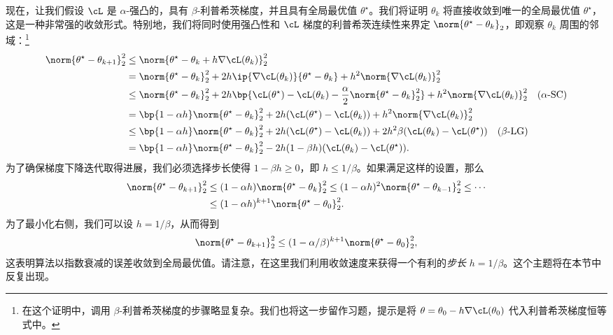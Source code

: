 \documentclass[../../book-main_zh.tex]{subfiles}
\begin{document}
现在，让我们假设 \(\cL\) 是 \(\alpha\)-强凸的，具有 \(\beta\)-利普希茨梯度，并且具有全局最优值 \(\theta^{\star}\)。我们将证明 \(\theta_{k}\) 将直接收敛到唯一的全局最优值 \(\theta^{\star}\)，这是一种非常强的收敛形式。特别地，我们将同时使用强凸性和 \(\cL\) 梯度的利普希茨连续性来界定 \(\norm{\theta^{\star} - \theta_{k}}_{2}\)，即观察 \(\theta_{k}\) 周围的邻域：\footnote{在这个证明中，调用 \(\beta\)-利普希茨梯度的步骤略显复杂。我们也将这一步留作习题，提示是将 \(\theta = \theta_{0} - h\nabla \cL(\theta_{0})\) 代入利普希茨梯度恒等式中。}
\begin{align}
    \norm{\theta^{\star} - \theta_{k + 1}}_{2}^{2}
    &\leq \norm{\theta^{\star} - \theta_{k} + h\nabla
    \cL(\theta_{k})}_{2}^{2} \\
    &= \norm{\theta^{\star} - \theta_{k}}_{2}^{2} + 2h\ip{\nabla
    \cL(\theta_{k})}{\theta^{\star} - \theta_{k}} + h^{2}\norm{\nabla
    \cL(\theta_{k})}_{2}^{2} \\
    &\leq \norm{\theta^{\star} - \theta_{k}}_{2}^{2} +
    2h\bp{\cL(\theta^{\star}) - \cL(\theta_{k}) -
    \frac{\alpha}{2}\norm{\theta^{\star} - \theta_{k}}_{2}^{2}} +
    h^{2}\norm{\nabla \cL(\theta_{k})}_{2}^{2} \quad \text{(\(\alpha\)-SC)} \\
    &= \bp{1 - \alpha h}\norm{\theta^{\star} - \theta_{k}}_{2}^{2} +
    2h(\cL(\theta^{\star}) - \cL(\theta_{k})) + h^{2}\norm{\nabla
    \cL(\theta_{k})}_{2}^{2} \\
    &\leq \bp{1 - \alpha h}\norm{\theta^{\star} - \theta_{k}}_{2}^{2}
    + 2h(\cL(\theta^{\star}) - \cL(\theta_{k})) +
    2h^{2}\beta(\cL(\theta_{k}) - \cL(\theta^{\star})) \quad
    \text{(\(\beta\)-LG)} \\
    &= \bp{1 - \alpha h}\norm{\theta^{\star} - \theta_{k}}_{2}^{2} -
    2h(1 - \beta h)(\cL(\theta_{k}) - \cL(\theta^{\star})).
\end{align}
为了确保梯度下降迭代取得进展，我们必须选择步长使得 \(1 - \beta h \geq 0\)，即 \(h \leq 1/\beta\)。如果满足这样的设置，那么
\begin{align}
    \norm{\theta^{\star} - \theta_{k + 1}}_{2}^{2}
    &\leq (1 - \alpha h)\norm{\theta^{\star} - \theta_{k}}_{2}^{2}
    \leq (1 - \alpha h)^{2}\norm{\theta^{\star} - \theta_{k -
    1}}_{2}^{2} \leq \cdots \\
    &\leq (1 - \alpha h)^{k + 1}\norm{\theta^{\star} - \theta_{0}}_{2}^{2}.
\end{align}
为了最小化右侧，我们可以设 \(h = 1/\beta\)，从而得到
\begin{equation}
    \norm{\theta^{\star} - \theta_{k + 1}}_{2}^{2} \leq (1 -
    \alpha/\beta)^{k + 1}\norm{\theta^{\star} - \theta_{0}}_{2}^{2},
\end{equation}
这表明算法以指数衰减的误差收敛到全局最优值。请注意，在这里我们利用收敛速度来获得一个有利的\textit{步长} \(h = 1/\beta\)。这个主题将在本节中反复出现。
\end{document}
